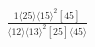 \documentclass[varwidth, border=5pt]{standalone}
\begin{document}
\begin{my}
$\begin{gathered}
\scriptscriptstyle\frac{1⟨25⟩⟨15⟩^2[45]}{⟨12⟩⟨13⟩^2[25]⟨45⟩}
\end{gathered}$
\end{my}
\end{document}
